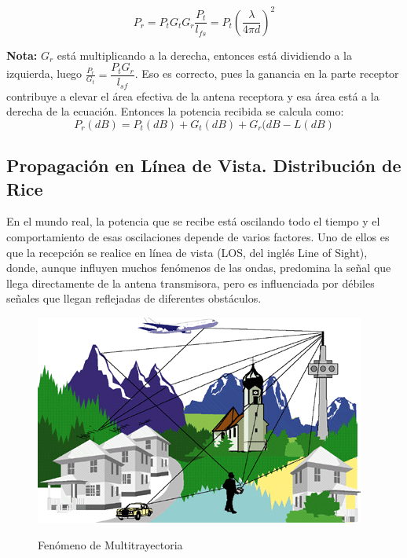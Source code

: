 \begin{equation} \label{equ_cincuenta_nueve}
	 P_r= P_t G_t G_r\frac{P_t}{l_{fs}}=P_t\left(\frac{\lambda}{4\pi d}\right)^{2}
\end{equation}

\textbf{Nota:} $G_r$ está multiplicando a la derecha, entonces está dividiendo a la izquierda, luego $\frac{P_r}{G_t}= \dfrac{P_tG_r}{l_{sf}}$. Eso es correcto, pues la ganancia en la parte receptor contribuye a elevar el área efectiva de la antena receptora y esa área está a la derecha de la ecuación.
Entonces la potencia recibida se calcula como: \\

\begin{equation} \label{equ_sesenta}
	P_r(dB)=P_t(dB)+G_t(dB)+G_r(dB-L(dB)
\end{equation}

\subsection{Propagación en Línea de Vista. Distribución de Rice}
En el mundo real, la potencia que se recibe está oscilando todo el tiempo y el comportamiento de esas oscilaciones depende de varios factores. Uno de ellos es que la recepción se realice en línea de vista (LOS, del inglés Line of Sight), donde, aunque influyen muchos fenómenos de las ondas, predomina la señal que llega directamente de la antena transmisora, pero es influenciada por débiles señales que llegan reflejadas de diferentes obstáculos. \\
\begin{figure}[h!]
	\captionsetup{justification = raggedright, singlelinecheck = false}
	\caption{Fenómeno de Multitrayectoria} 
	\centering
	\includegraphics[scale=1]{Imagenes/Edificio.png}
	\label{fig:Edificio}
\end{figure}

